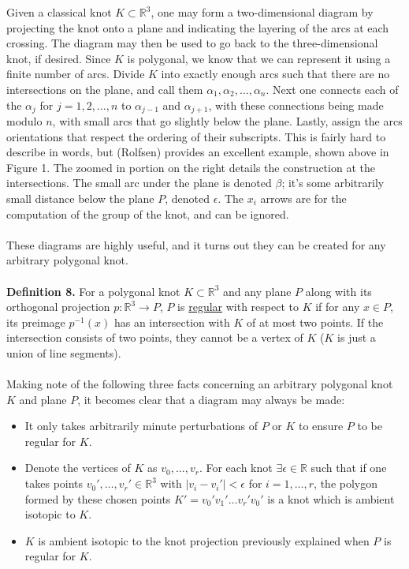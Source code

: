 \documentclass{article}
\begin{document}
Given a classical knot $K \subset \mathbb{R}^3$, one may form a two-dimensional diagram by projecting the knot onto a plane and indicating the layering of the arcs at each crossing.  The diagram may then be used to go back to the three-dimensional knot, if desired.  Since $K$ is polygonal, we know that we can represent it using a finite number of arcs.  Divide $K$ into exactly enough arcs such that there are no intersections on the plane, and call them $\alpha_1, \alpha_2, \ldots, \alpha_n$.  Next one connects each of the $\alpha_j$ for $j = 1, 2, \ldots, n$ to $\alpha_{j-1}$ and $\alpha_{j+1}$, with these connections being made modulo $n$, with small arcs that go slightly below the plane.  Lastly, assign the arcs orientations that respect the ordering of their subscripts.  This is fairly hard to describe in words, but (Rolfsen) provides an excellent example, shown above in Figure 1.  The zoomed in portion on the right details the construction at the intersections.  The small arc under the plane is denoted $\beta$; it's some arbitrarily small distance below the plane $P$, denoted $\epsilon$.  The $x_i$ arrows are for the computation of the group of the knot, and can be ignored.
\\
\\
These diagrams are highly useful, and it turns out they can be created for any arbitrary polygonal knot.  
\\
\\
\textbf{Definition 8.} For a polygonal knot $K \subset \mathbb{R}^3$ and any plane $P$ along with its orthogonal projection $p: \mathbb{R}^3 \rightarrow P$, $P$ is \underline{regular} with respect to $K$ if for any $x \in P$, its preimage $p^{-1}(x)$ has an intersection with $K$ of at most two points.  If the intersection consists of two points, they cannot be a vertex of $K$ ($K$ is just a union of line segments).
\\
\\ Making note of the following three facts concerning an arbitrary polygonal knot $K$ and plane $P$, it becomes clear that a diagram may always be made:
\begin{itemize}
	\item It only takes arbitrarily minute perturbations of $P$ or $K$ to ensure $P$ to be regular for $K$.
	\item Denote the vertices of $K$ as $v_0, \ldots, v_r$.  For each knot $\exists \epsilon \in \mathbb{R}$ such that if one takes 			points $v_0', \ldots, v_r' \in \mathbb{R}^3$ with $|v_i - v_i'| < \epsilon$ for $i = 1, \ldots, r$, the polygon formed by these 			chosen points $K' = v_0' v_1' \ldots v_r' v_0'$ is a knot which is ambient isotopic to $K$.
	\item $K$ is ambient isotopic to the knot projection previously explained when $P$ is regular for $K$.
\end{itemize}
\end{document}
